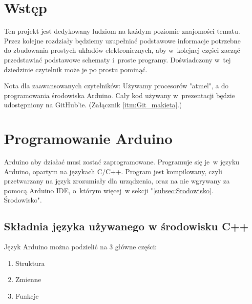 \documentclass[a4paper,12pt, twoside]{article}
\let\oldsection\section		%
\renewcommand\section{\clearpage\oldsection}%
\begin{document}
\newpage\null\thispagestyle{empty}\newpage


\thispagestyle{empty}
\tableofcontents 
\pagestyle{style1}

\thispagestyle {empty}

\section*{Wstęp}
\pagestyle{style2}
Ten projekt jest dedykowany ludziom na każdym poziomie znajomości tematu. Przez kolejne rozdziały będziemy uzupełniać podstawowe informacje potrzebne do zbudowania prostych układów elektronicznych, aby w~kolejnej części zacząć przedstawiać podstawowe schematy i~proste programy. Doświadczony w~tej dziedzinie czytelnik może je po prostu pominąć. 

Nota dla zaawansowanych czytelników:
Używamy procesorów "atmel", a do programowania środowiska Arduino. Cały kod używany w~prezentacji będzie udostępniony na GitHub'ie. (Załącznik \ref{itm:Git_makieta}.)

\section{Programowanie Arduino}
\pagestyle{style1}
Arduino aby działać musi zostać zaprogramowane. Programuje się je~w  języku Arduino, opartym na językach C/C++.
Program jest kompilowany, czyli przetwarzany na język zrozumiały dla urządzenia, oraz na nie wgrywany za pomocą
Arduino IDE, o~którym więcej~w  sekcji "\ref{subsec:Srodowisko}. Środowisko". 


\subsection {Składnia języka używanego w  środowisku C++}
  Język Arduino można podzielić na 3 główne części:
  \begin{enumerate}
	\item Struktura
	\item Zmienne
	\item Funkcje
\end{enumerate}
\end{document}
